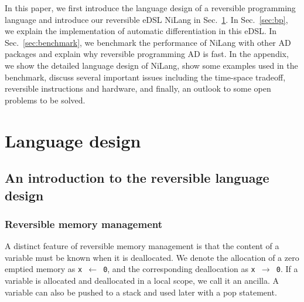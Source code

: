 \documentclass{article}
\newcommand{\<}{\langle}
\renewcommand{\>}{\rangle}
\newcommand{\Sec}[1]{Sec.~\ref{#1}}
\theoremstyle{definition}\newtheorem{definition}{\textit{Definition}}
\begin{document}
    In this paper, we first introduce the language design of a reversible programming language and introduce our reversible eDSL NiLang in \Sec{sec:lang}.
    In \Sec{sec:bp}, we explain the implementation of automatic differentiation in this eDSL.
    In \Sec{sec:benchmark}, we benchmark the performance of NiLang with other AD packages and explain why reversible programming AD is fast.
    In the appendix, we show the detailed language design of NiLang, show some examples used in the benchmark, discuss several important issues including the time-space  tradeoff, reversible instructions and hardware, and finally, an outlook to some open problems to be solved.


\section{Language design}\label{sec:lang}

\subsection{An introduction to the reversible language design}

\subsubsection{Reversible memory management}
    A distinct feature of reversible memory management is that the content of a variable must be known when it is deallocated.
    We denote the allocation of a zero emptied memory as \texttt{x $\leftarrow$ 0}, and the corresponding deallocation as \texttt{x $\rightarrow$ 0}.
    If a variable is allocated and deallocated in a local scope, we call it an ancilla.
    A variable can also be pushed to a stack and used later with a pop statement.
\end{document}
